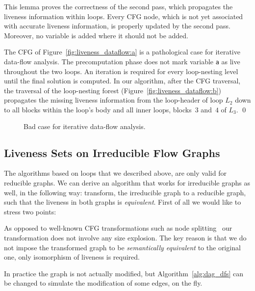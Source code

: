 This lemma proves the correctness of the second pass, which propagates the liveness information within loops.
Every CFG node, which is not yet associated with accurate liveness information, is properly updated by the second pass.
Moreover, no variable is added where it should not be added.

\begin{example}
	The CFG of Figure~\ref{fig:liveness_dataflow:a} is a pathological case for iterative data-flow analysis.
	The precomputation phase does not mark variable \texttt{a} as live throughout the two loops.
	An iteration is required for every loop-nesting level until the \pagebreak final solution is computed.
	In our algorithm, after the CFG traversal, the traversal of the loop-nesting forest (Figure~\ref{fig:liveness_dataflow:b}) propagates the missing liveness information from the loop-header of loop $L_2$ down to all blocks within the loop's body and all inner loops, \ie blocks~$3$ and~$4$ of $L_3$.
\qed \end{example}

\begin{figure}[t]
   \begin{center}
   \end{center}
   \caption{Bad case for iterative data-flow analysis.}
   \label{fig:liveness_dataflow}
\end{figure}


 \subsection{Liveness Sets on Irreducible Flow Graphs}
\label{sec:irreducible}

The algorithms based on loops that we described above, are only valid for reducible graphs.
We can derive an algorithm that works for irreducible graphs as well, in the following way:
transform, the irreducible graph to a reducible graph, such that the liveness in both graphs is \emph{equivalent}.
First of all we would like to stress two points:
\begin{asparaenum}[(1)]
\item
	As opposed to well-known CFG transformations such as node splitting~\cite{JC97,ASU06} our transformation does not involve any size explosion.
The key reason is that we do not impose the transformed graph to be \emph{semantically equivalent} to the original one, only isomorphism of liveness is required.
\item
	In practice the graph is not actually modified, but Algorithm~\ref{alg:dag_dfs} can be changed to simulate the modification of some edges, on the fly.
\end{asparaenum}

